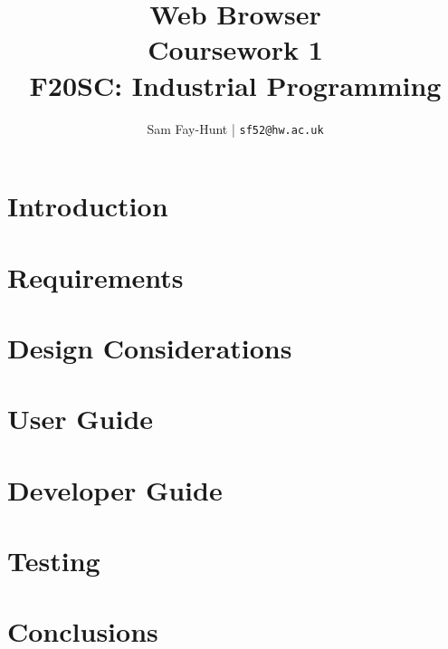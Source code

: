 \documentclass[11pt]{article}
\begin{document}
\title{%
	\bf Web Browser\\ 
	\large Coursework 1 \\
	F20SC: Industrial Programming}

\author{
	Sam Fay-Hunt | \texttt{sf52@hw.ac.uk}
}

\maketitle
\thispagestyle{empty}
\pagebreak


\tableofcontents
\thispagestyle{empty}
\pagebreak


\setcounter{page}{1}

\section{Introduction}


\section{Requirements}

\pagebreak

\section{Design Considerations}


\section{User Guide}


\section{Developer Guide}


\section{Testing}


\section{Conclusions}

\end{document}
